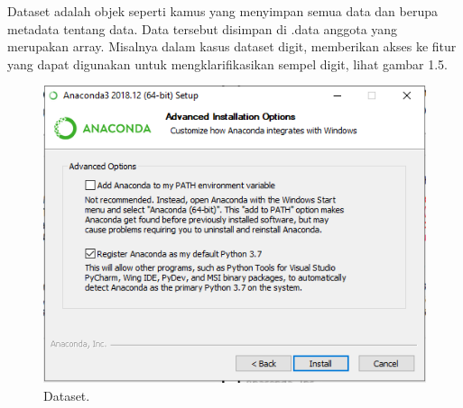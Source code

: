 \begin{enumerate}
\subitem
Dataset adalah objek seperti kamus yang menyimpan semua data dan berupa metadata tentang data. Data tersebut disimpan di .data anggota yang merupakan array. Misalnya dalam kasus dataset digit, memberikan akses ke fitur yang dapat digunakan untuk mengklarifikasikan sempel digit, lihat gambar 1.5.

\begin{figure}[ht]\centerline{\includegraphics[width=1\textwidth]{figures/6.PNG}}\caption{Dataset.}\end{figure}

\end{enumerate}





